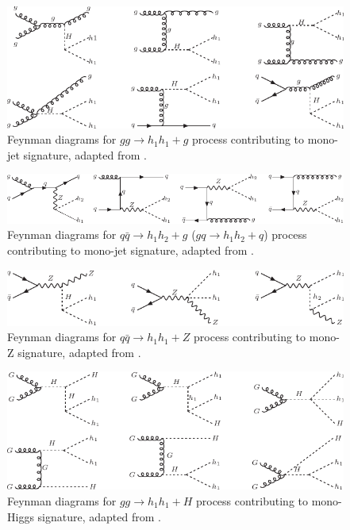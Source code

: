 \begin{figure}
\includegraphics[width=\textwidth]{figures/EW/i2HDM/fd-mono-j1.pdf} 
\caption{Feynman diagrams for $gg\to h_1 h_1+g$ process
contributing to mono-jet signature, adapted from \cite{Belyaev:2015tap}.}
\label{fig:fdmonojet1}
\end{figure}
\begin{figure}[htb]
\includegraphics[width=\textwidth]{figures/EW/i2HDM/fd-mono-j2.pdf} 
\caption{Feynman diagrams for $q\bar{q}\to h_1 h_2+g$ ($gq\to h_1 h_2+q$) process 
contributing to mono-jet signature, adapted from \cite{Belyaev:2015tap}.}
\label{fig:fdmonojet2}
\end{figure}
\begin{figure}[htb]
\includegraphics[width=\textwidth]{figures/EW/i2HDM/fd-mono-z.pdf} 
\caption{Feynman diagrams for $q\bar{q}\to h_1 h_1+Z$  process 
contributing to mono-Z signature, adapted from \cite{Belyaev:2015tap}.}
\label{fig:fdmonoZ}
\end{figure}
\begin{figure}[htb]
\includegraphics[width=\textwidth]{figures/EW/i2HDM/fd-mono-h1.pdf} 
\caption{Feynman diagrams for $gg\to h_1 h_1+H$  process 
contributing to mono-Higgs signature, adapted from \cite{Belyaev:2015tap}.}
\label{fig:fdmonoH1}
\end{figure}
